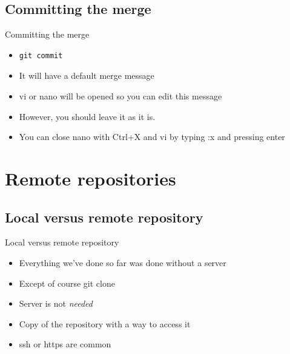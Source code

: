 \documentclass[10pt,a4paper]{beamer}
\begin{document}
\subsection{Committing the merge}
\begin{frame}[fragile]{Committing the merge}
\begin{itemize}
\item \begin{verbatim}git commit\end{verbatim}
\item It will have a default merge message
\item vi or nano will be opened so you can edit this message
\item However, you should leave it as it is.
\item You can close nano with Ctrl+X and vi by typing :x and pressing enter
\end{itemize}
\end{frame}


\section{Remote repositories}

\subsection{Local versus remote repository}
\begin{frame}{Local versus remote repository}
\begin{itemize}
\item Everything we've done so far was done without a server
\item Except of course git clone
\item Server is not \textit{needed}
\item Copy of the repository with a way to access it
\item ssh or https are common
\end{itemize}
\end{frame}
\end{document}
